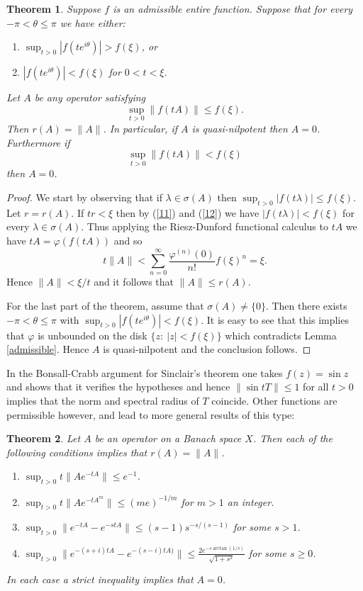\documentclass[12pt]{amsart}
\newtheorem{thm}{Theorem}[section]
\begin{document}
\begin{thm}\label{sinclairtype}  Suppose $f$ is an admissible
entire function.  Suppose that for every $-\pi<\theta\le \pi$ we
have either:
\begin{enumerate}
\item
\label{11}
$\displaystyle\sup_{t>0}|f(te^{i\theta})|> f(\xi)$,
or
\item
\label{12}
$\displaystyle|f(te^{i\theta})|<f(\xi)$ for $0<t<\xi $.
\end{enumerate}
Let $A$ be
any operator satisfying
$$ \sup_{t>0}\|f(tA)\|\le f(\xi).$$ Then
$ r(A)=\|A\|$. In particular, if $A$ is quasi-nilpotent then
$A=0$. Furthermore if
$$ \sup_{t>0}\|f(tA)\|< f(\xi)$$ then $A=0$.
\end{thm}



\begin{proof}  We start by observing that if $\lambda\in\sigma(A)$
then $\sup_{t>0} |f(t\lambda)|\le f(\xi)$.  Let $r=r(A)$.  If
$tr<\xi$ then  by (\ref{11}) and (\ref{12}) we have
$|f(t\lambda)|<f(\xi)$ for every $\lambda\in\sigma(A)$.
  Thus applying the Riesz-Dunford functional calculus to $tA$ we have $tA=\varphi (f(tA))$
and so
$$ t\|A\|<\sum_{n=0}^{\infty}\frac{\varphi^{(n)}(0)}{n!}f(\xi)^n=\xi.$$
Hence $\|A\|< \xi/t$ and it follows that $\|A\|\le r(A)$.

For the last part of the theorem, assume that $\sigma(A)\neq
\{0\}$.  Then there exists $-\pi<\theta\le \pi$ with
$\sup_{t>0}|f(te^{i\theta})|<f(\xi)$.  It is easy to see that this
implies that $\varphi$ is unbounded on the disk $\{z:\
|z|<f(\xi)\}$ which contradicts Lemma \ref{admissible}.  Hence $A$
is quasi-nilpotent and the conclusion follows.\end{proof}

In the Bonsall-Crabb argument for Sinclair's theorem one takes
$f(z)=\sin z$ and shows that it verifies the hypotheses and hence
$\|\sin tT\|\le 1$ for all $t>0$ implies that the norm and
spectral radius of $T$ coincide. Other functions are permissible
however, and lead to more general results of this type:

\begin{thm}\label{appl} Let $A$ be an operator on a Banach space $X$.  Then
each of the following conditions implies that $r(A)=\|A\|$.
\begin{enumerate}
\item $\displaystyle\sup_{t>0} t\|Ae^{-tA}\|\le e^{-1}$.
\item $\displaystyle\sup_{t>0} t\|Ae^{-tA^m}\|\le (me)^{-1/m}$ for
$m>1$ an integer.
\item $\displaystyle\sup_{t>0}\|e^{-tA}-e^{-stA}\|\le (s-1) s^{-s/(s-1)}
$ for some $ s>1$.
\item $\displaystyle\sup_{t>0}\|e^{-(s+i)tA}-e^{-(s-i)tA)}\|\le
\frac{2e^{-s\arctan(1/s)}}{\sqrt{1+s^2}}$ for some $s\ge 0$.
\end{enumerate}  In each case a strict inequality implies that
$A=0$.
\end{thm}
\end{document}
